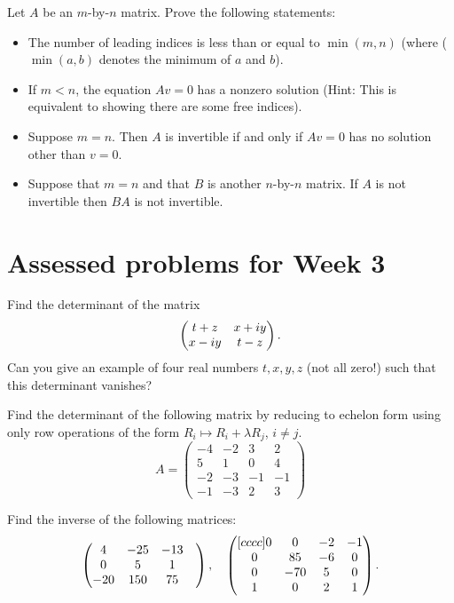 \documentclass{article}
\begin{document}
\begin{Exercise}
Let \(A\) be an \(m\)-by-\(n\) matrix. Prove the following
statements:
\begin{itemize}
\item The number of leading indices is less than or equal to
\(\min(m,n)\) (where (\(\min(a,b)\) denotes the minimum of \(a\)
and \(b\)).
\item If \(m<n\), the equation \(Av=0\) has a nonzero solution (Hint:
This is equivalent to showing there are some free indices).
\item Suppose \(m=n\). Then \(A\) is invertible if and only if \(Av=0\)
has no solution other than \(v=0\).
\item Suppose that \(m=n\) and that \(B\) is another \(n\)-by-\(n\)
matrix. If \(A\) is not invertible then \(BA\) is not invertible.


\end{itemize}
\end{Exercise}
\newpage


\section{Assessed problems for Week 3}


\begin{Exercise}
Find the determinant of the matrix  \[\begin{pmatrix} t+z & x+iy \\ x-iy
& t-z\end{pmatrix}.\] Can you give an example of four real numbers \(t,x,y,z\)
(not all zero!) such that this determinant vanishes?


\end{Exercise}
\begin{Exercise}
Find the determinant of the following matrix by reducing to 
echelon form using only row operations of the form \(R_i\mapsto
R_i+\lambda R_j\), \(i\neq j\). \[A=\begin{pmatrix} -4 & -2 & 3 & 2
\\ 5 & 1 & 0 & 4 \\ -2 & -3 & -1 & -1 \\ -1 & -3 & 2 & 3
\end{pmatrix}\]


\end{Exercise}
\begin{Exercise}
Find the inverse of the following matrices:  \[\begin{pmatrix} 4 & -25
& -13 \\ 0 & 5 & 1 & \\ -20 & 150 & 75 \end{pmatrix},\quad\begin{pmatrix}[ c c
c c ] 0 & 0 & -2 & -1 \\ 0 & 85 & -6 & 0 \\ 0 & -70 & 5 & 0 \\ 1 & 0
& 2 & 1 \end{pmatrix}.\]
\end{Exercise}
\end{document}
